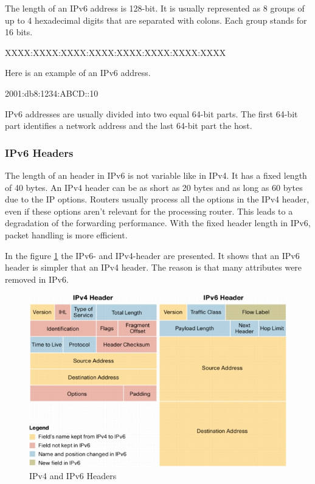 \documentclass[a4paper]{report}
\begin{document}
The length of an IPv6 address is 128-bit. It is usually represented as 8 groups of up to 4 hexadecimal digits that are separated with colons. Each group stands for 16 bits.
\begin{quotebox}
	XXXX:XXXX:XXXX:XXXX:XXXX:XXXX:XXXX:XXXX
\end{quotebox}
Here is an example of an IPv6 address.
\begin{quotebox}
	2001:db8:1234:ABCD::10
\end{quotebox}
IPv6 addresses are usually divided into two equal 64-bit parts. The first 64-bit part identifies a network address and the last 64-bit part the host. \parencite[144-146]{Loshin2004}
 
\subsubsection{IPv6 Headers}
\label{sssec:ipv6:headers}
The length of an header in IPv6 is not variable like in IPv4. It has a fixed length of 40 bytes. An IPv4 header can be as short as 20 bytes and as long as 60 bytes due to the IP options. Routers usually process all the options in the IPv4 header, even if these options aren't relevant for the processing router. This leads to a degradation of the forwarding performance.  With the fixed header length in IPv6, packet handling is more efficient. \parencite[128]{Loshin2004}

In the figure \ref{fig:IPv4_IPv6_Header} the IPv6- and IPv4-header are presented. It shows that an IPv6 header is simpler that an IPv4 header. The reason is that many attributes were removed in IPv6.
\begin{figure}
	\centering
	\includegraphics[width=0.8\linewidth]{ipv6_ipv4_headers}%
	\caption {IPv4 and IPv6 Headers \parencite{cisco2006}}
	\label{fig:IPv4_IPv6_Header}
\end{figure}
\end{document}
